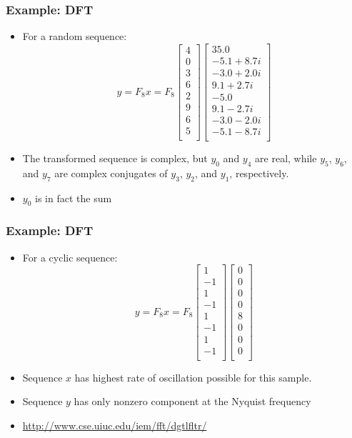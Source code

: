 \documentclass[10pt]{beamer}
\begin{document}
\begin{frame}
\frametitle{Example: DFT}
\begin{itemize}
  \item For a random sequence:
\[
  y = F_8 x = F_8 
  \begin{bmatrix}
4\\ 0\\ 3\\ 6\\ 2\\ 9\\ 6\\ 5\\
  \end{bmatrix}
  \begin{bmatrix}
  35.0          \\
  -5.1 + 8.7i\\
  -3.0 + 2.0i\\
   9.1 + 2.7i\\
  -5.0          \\
   9.1 - 2.7i\\
  -3.0 - 2.0i\\
  -5.1 - 8.7i\\
  \end{bmatrix}
\]
\item The transformed sequence is complex, but $y_0$ and $y_4$ are real, while
$y_5$, $y_6$, and $y_7$ are complex conjugates of $y_3$, $y_2$, and $y_1$,
respectively.
\item $y_0$ is in fact the sum
\end{itemize}
\end{frame}
\begin{frame}
\frametitle{Example: DFT}
\begin{itemize}
  \item For a cyclic sequence:
\[
  y = F_8 x = F_8 
  \begin{bmatrix}
1\\ -1\\
1\\ -1\\
1\\ -1\\
1\\ -1\\
  \end{bmatrix}
  \begin{bmatrix}
0\\ 0\\
0\\ 0\\
8\\ 0\\
0\\ 0\\
  \end{bmatrix}
\]
\item Sequence $x$ has highest rate of oscillation possible for this sample.
\item Sequence $y$ has only nonzero component at the Nyquist frequency
\item \url{http://www.cse.uiuc.edu/iem/fft/dgtlfltr/}
\end{itemize}
\end{frame}
\end{document}
